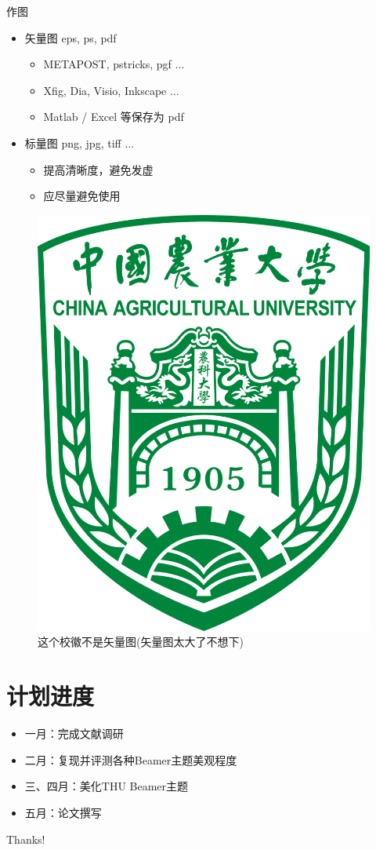 \documentclass[aspectratio=43]{beamer} %
\begin{document}
\begin{frame}{作图}
    \begin{itemize}
        \item 矢量图 eps, ps, pdf
              \begin{itemize}
                  \item METAPOST, pstricks, pgf $\ldots$
                  \item Xfig, Dia, Visio, Inkscape $\ldots$
                  \item Matlab / Excel 等保存为 pdf
              \end{itemize}
        \item 标量图 png, jpg, tiff $\ldots$
              \begin{itemize}
                  \item 提高清晰度，避免发虚
                  \item 应尽量避免使用
              \end{itemize}
    \end{itemize}
    \begin{figure}[htpb]
        \centering
        \includegraphics[width=0.2\linewidth]{pic/China_Agricultural_University_Logo.png}
        \caption{这个校徽不是矢量图(矢量图太大了不想下)}
    \end{figure}
\end{frame}


\section{计划进度}
\begin{frame}
    \begin{itemize}
        \item 一月：完成文献调研
        \item 二月：复现并评测各种Beamer主题美观程度
        \item 三、四月：美化THU Beamer主题
        \item 五月：论文撰写
    \end{itemize}
\end{frame}

\appendix

\begin{frame}[allowframebreaks]
    
    
\end{frame}

\begin{frame}
    \begin{center}
        {\Huge\calligra Thanks!}
    \end{center}
\end{frame}
\end{document}
